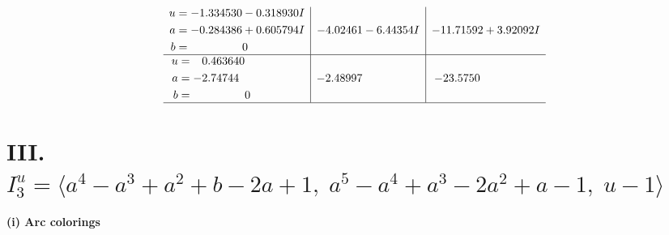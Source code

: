 \documentclass[1p]{elsarticle_modified}
\theoremstyle{definition}
\begin{document}
$$\begin{array}{c|c|c}
\begin{aligned}
u &= -1.334530 - 0.318930 I \\
a &= -0.284386 + 0.605794 I \\
b &= \phantom{-0.000000 } 0\end{aligned}
 & -4.02461 - 6.44354 I & -11.71592 + 3.92092 I \\ \hline\begin{aligned}
u &= \phantom{-}0.463640\phantom{ +0.000000I} \\
a &= -2.74744\phantom{ +0.000000I} \\
b &= \phantom{-0.000000 } 0\end{aligned}
 & -2.48997\phantom{ +0.000000I} & -23.5750\phantom{ +0.000000I}\\
 \hline 
 \end{array}$$\newpage\newpage\renewcommand{\arraystretch}{1}
\centering \section*{III. $I^u_{3}= \langle a^4- a^3+a^2+b-2 a+1,\;a^5- a^4+a^3-2 a^2+a-1,\;u-1 \rangle$}
\flushleft \textbf{(i) Arc colorings}\\
\end{document}
